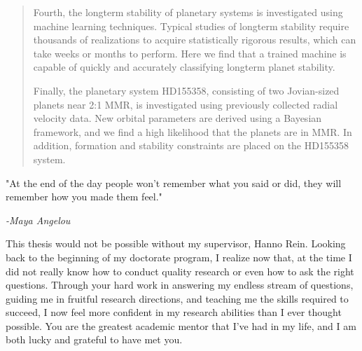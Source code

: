 \documentclass[letterpaper]{ut-thesis} %
\begin{document}
\begin{preliminary}
\begin{abstract}
Fourth, the longterm stability of planetary systems is investigated using machine learning techniques.
Typical studies of longterm stability require thousands of realizations to acquire statistically rigorous results, which can take weeks or months to perform. 
Here we find that a trained machine is capable of quickly and accurately classifying longterm planet stability. 
 
Finally, the planetary system HD155358, consisting of two Jovian-sized planets near 2:1 MMR, is investigated using previously collected radial velocity data. 
New orbital parameters are derived using a Bayesian framework, and we find a high likelihood that the planets are in MMR.
In addition, formation and stability constraints are placed on the HD155358 system.
 
\end{abstract}
\cleardoublepage



\vspace*{\fill}
\begin{center}
\begin{minipage}[c]{4.75in}
 "At the end of the day people won't remember what you said or did, they will remember how you made them feel." \vspace{1em}
 
\hfill \emph{-Maya Angelou}


\end{minipage}
\end{center}
\vspace*{\fill}

\cleardoublepage

\begin{acknowledgements}
This thesis would not be possible without my supervisor, Hanno Rein. 
Looking back to the beginning of my doctorate program, I realize now that, at the time I did not really know how to conduct quality research or even how to ask the right questions.
Through your hard work in answering my endless stream of questions, guiding me in fruitful research directions, and teaching me the skills required to succeed, I now feel more confident in my research abilities than I ever thought possible. 
You are the greatest academic mentor that I've had in my life, and I am both lucky and grateful to have met you. 


\end{acknowledgements}
\end{preliminary}
\end{document}
